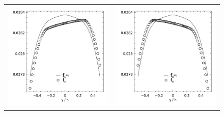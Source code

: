 \begin{figure}
\centering
\begin{tabulary}{\linewidth}{c c}
\includegraphics[width=\figwid]{figs/poise-bingham/bgk-5/feq-vs-f_5.png}
&
\includegraphics[width=\figwid]{figs/poise-bingham/bgk-5/feq-vs-f_8.png}

\end{tabulary}
\end{figure}
